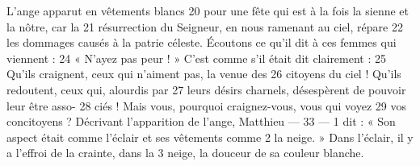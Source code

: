 L'ange apparut en vêtements blancs	 
20	 	pour une fête qui est à la fois la sienne et la nôtre, car la	 
21	 	résurrection du Seigneur, en nous ramenant au ciel, répare	 
22	 	les dommages causés à la patrie céleste.
Écoutons ce qu'il dit à ces femmes qui viennent :	 
24	 	« N'ayez pas peur ! » C'est comme s'il était dit clairement :	 
25	 	Qu'ils craignent, ceux qui n'aiment pas, la venue des	 
26	 	citoyens du ciel ! Qu'ils redoutent, ceux qui, alourdis par	 
27	 	leurs désirs charnels, désespèrent de pouvoir leur être asso-	 
28	 	ciés ! Mais vous, pourquoi craignez-vous, vous qui voyez	 
29	 	vos concitoyens ? Décrivant l'apparition de l'ange, Matthieu	 
 	--- 33 ---	 
1	 	dit : « Son aspect était comme l'éclair et ses vêtements comme	 
2	 	la neige. » Dans l'éclair, il y a l'effroi de la crainte, dans la	 
3	 	neige, la douceur de sa couleur blanche.